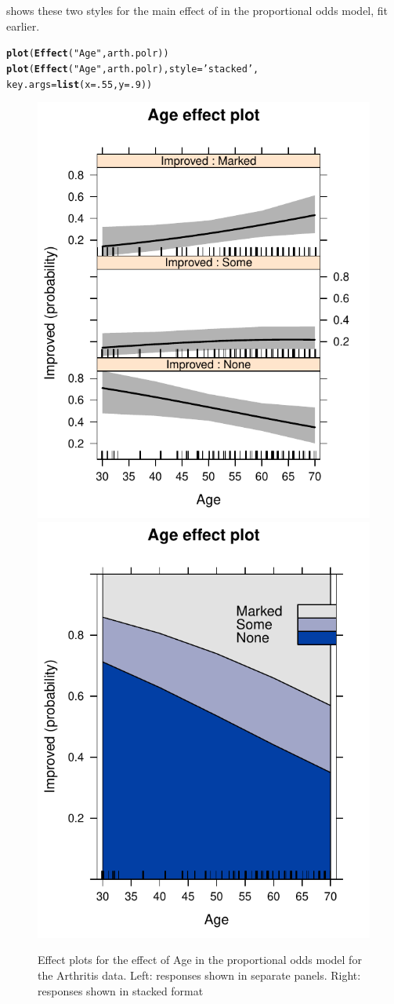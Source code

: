 \documentclass[11pt]{book}\usepackage[]{graphicx}\usepackage[]{color}
\makeatletter
\newcommand{\hlnum}[1]{\textcolor[rgb]{0.686,0.059,0.569}{#1}}%
\newcommand{\hlstr}[1]{\textcolor[rgb]{0.192,0.494,0.8}{#1}}%
\newcommand{\hlstd}[1]{\textcolor[rgb]{0.345,0.345,0.345}{#1}}%
\newcommand{\hlkwc}[1]{\textcolor[rgb]{0.333,0.667,0.333}{#1}}%
\newcommand{\hlkwd}[1]{\textcolor[rgb]{0.737,0.353,0.396}{\textbf{#1}}}%
\newenvironment{kframe}{%
 \def\at@end@of@kframe{}%
 \ifinner\ifhmode%
  \def\at@end@of@kframe{\end{minipage}}%
  \begin{minipage}{\columnwidth}%
 \fi\fi%
 \def\FrameCommand##1{\hskip\@totalleftmargin \hskip-\fboxsep
 \colorbox{shadecolor}{##1}\hskip-\fboxsep
     \hskip-\linewidth \hskip-\@totalleftmargin \hskip\columnwidth}%
 \MakeFramed {\advance\hsize-\width
   \@totalleftmargin\z@ \linewidth\hsize
   \@setminipage}}%
 {\par\unskip\endMakeFramed%
 \at@end@of@kframe}
\newenvironment{knitrout}{}{} %
\renewenvironment{knitrout}{\small\renewcommand{\baselinestretch}{.85}}{} %
\makeatother
\begin{document}
 shows these two styles for the main effect of 
in the proportional odds model,  fit earlier.
\begin{knitrout}
\color{fgcolor}\begin{kframe}
\begin{alltt}
\hlkwd{plot}\hlstd{(}\hlkwd{Effect}\hlstd{(}\hlstr{"Age"}\hlstd{, arth.polr))}
\hlkwd{plot}\hlstd{(}\hlkwd{Effect}\hlstd{(}\hlstr{"Age"}\hlstd{, arth.polr),} \hlkwc{style}\hlstd{=}\hlstr{'stacked'}\hlstd{,}
     \hlkwc{key.args}\hlstd{=}\hlkwd{list}\hlstd{(}\hlkwc{x}\hlstd{=}\hlnum{.55}\hlstd{,} \hlkwc{y}\hlstd{=}\hlnum{.9}\hlstd{))}
\end{alltt}
\end{kframe}\begin{figure}[!htbp]


\centerline{\includegraphics[width=.49\textwidth]{ch07/fig/arth-po-eff1-1} 
\includegraphics[width=.49\textwidth]{ch07/fig/arth-po-eff1-2} }

\caption[Effect plots for the effect of Age in the proportional odds model for the Arthritis data]{Effect plots for the effect of Age in the proportional odds model for the Arthritis data.  Left: responses shown in separate panels. Right: responses shown in stacked format\label{fig:arth-po-eff1}}
\end{figure}


\end{knitrout}
\end{document}
